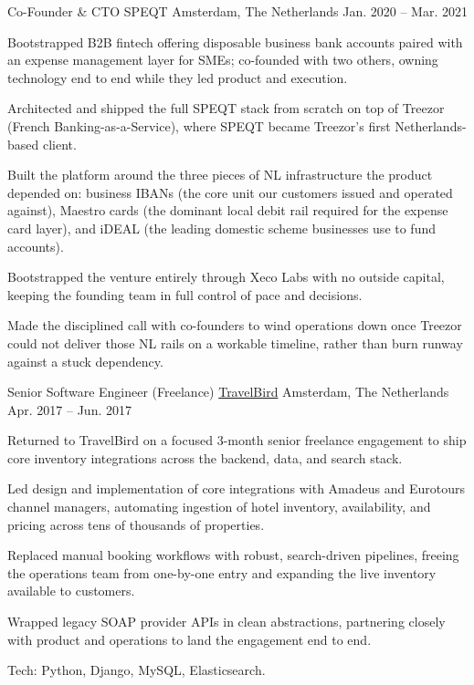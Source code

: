 \begin{cventries}
  \cventry
    {Co-Founder \& CTO} %
    {SPEQT} %
    {Amsterdam, The Netherlands} %
    {Jan. 2020 -- Mar. 2021} %
    {
      \begin{cvitems} %
        \item {Bootstrapped B2B fintech offering disposable business bank accounts paired with an expense management layer for SMEs; co-founded with two others, owning technology end to end while they led product and execution.}
        \item {Architected and shipped the full SPEQT stack from scratch on top of Treezor (French Banking-as-a-Service), where SPEQT became Treezor's first Netherlands-based client.}
        \item {Built the platform around the three pieces of NL infrastructure the product depended on: business IBANs (the core unit our customers issued and operated against), Maestro cards (the dominant local debit rail required for the expense card layer), and iDEAL (the leading domestic scheme businesses use to fund accounts).}
        \item {Bootstrapped the venture entirely through Xeco Labs with no outside capital, keeping the founding team in full control of pace and decisions.}
        \item {Made the disciplined call with co-founders to wind operations down once Treezor could not deliver those NL rails on a workable timeline, rather than burn runway against a stuck dependency.}
      \end{cvitems}
    }

  \cventry
    {Senior Software Engineer (Freelance)} %
    {\href{https://travelbird.nl/}{TravelBird}} %
    {Amsterdam, The Netherlands} %
    {Apr. 2017 -- Jun. 2017} %
    {
      \begin{cvitems} %
        \item {Returned to TravelBird on a focused 3-month senior freelance engagement to ship core inventory integrations across the backend, data, and search stack.}
        \item {Led design and implementation of core integrations with Amadeus and Eurotours channel managers, automating ingestion of hotel inventory, availability, and pricing across tens of thousands of properties.}
        \item {Replaced manual booking workflows with robust, search-driven pipelines, freeing the operations team from one-by-one entry and expanding the live inventory available to customers.}
        \item {Wrapped legacy SOAP provider APIs in clean abstractions, partnering closely with product and operations to land the engagement end to end.}
        \item {Tech: Python, Django, MySQL, Elasticsearch.}
      \end{cvitems}
    }


\end{cventries}
